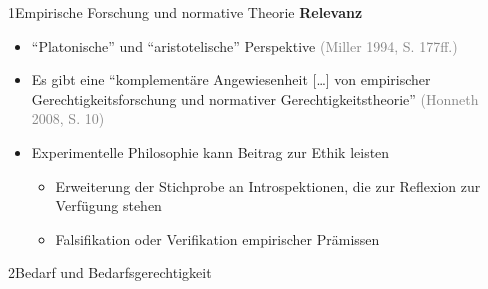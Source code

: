 \documentclass[xcolor=table,9pt,aspectratio=169]{beamer}
\begin{document}
\begin{frame}{\vspace*{10mm}1\hspace*{1em}Empirische Forschung und normative Theorie}
\textbf{Relevanz}\\
\medskip
\begin{itemize}
   \item \enquote{Platonische} und \enquote{aristotelische} Perspektive \textcolor{gray}{(Miller 1994, S. 177ff.)}
   \item Es gibt eine \enquote{komplementäre Angewiesenheit [\ldots] von empirischer Gerechtigkeitsforschung und normativer Gerechtigkeitstheorie} \textcolor{gray}{(Honneth 2008, S. 10)}
   \item Experimentelle Philosophie kann Beitrag zur Ethik leisten
   \begin{itemize}
      \item Erweiterung der Stichprobe an Introspektionen, die zur Reflexion zur Verfügung stehen
      \item Falsifikation oder Verifikation empirischer Prämissen
   \end{itemize}
\end{itemize}
\end{frame}


\begin{frame}
\begin{overlayarea}{\textwidth}{0.81\paperheight}{
   \vspace*{11mm}
   \textcolor{uolblue}
   {2\hspace*{1em}Bedarf und Bedarfsgerechtigkeit}
}
\end{overlayarea}
\end{frame}
\end{document}
